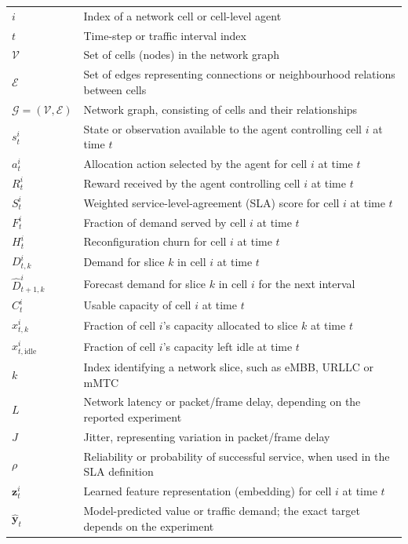 \begin{longtable}{p{3.2cm} p{11cm}}
$i$ & Index of a network cell or cell-level agent \\
$t$ & Time-step or traffic interval index \\
$\mathcal{V}$ & Set of cells (nodes) in the network graph \\
$\mathcal{E}$ & Set of edges representing connections or neighbourhood relations between cells \\
$\mathcal{G}=(\mathcal{V},\mathcal{E})$ & Network graph, consisting of cells and their relationships \\
$s_t^i$ & State or observation available to the agent controlling cell $i$ at time $t$ \\
$a_t^i$ & Allocation action selected by the agent for cell $i$ at time $t$ \\
$R_t^i$ & Reward received by the agent controlling cell $i$ at time $t$ \\
$S_t^i$ & Weighted service-level-agreement (SLA) score for cell $i$ at time $t$ \\
$F_t^i$ & Fraction of demand served by cell $i$ at time $t$ \\
$H_t^i$ & Reconfiguration churn for cell $i$ at time $t$ \\
$D_{t,k}^i$ & Demand for slice $k$ in cell $i$ at time $t$ \\
$\widehat{D}_{t+1,k}^i$ & Forecast demand for slice $k$ in cell $i$ for the next interval \\
$C_t^i$ & Usable capacity of cell $i$ at time $t$ \\
$x_{t,k}^i$ & Fraction of cell $i$'s capacity allocated to slice $k$ at time $t$ \\
$x_{t,\mathrm{idle}}^i$ & Fraction of cell $i$'s capacity left idle at time $t$ \\
$k$ & Index identifying a network slice, such as eMBB, URLLC or mMTC \\
$L$ & Network latency or packet/frame delay, depending on the reported experiment \\
$J$ & Jitter, representing variation in packet/frame delay \\
$\rho$ & Reliability or probability of successful service, when used in the SLA definition \\
$\mathbf{z}_t^i$ & Learned feature representation (embedding) for cell $i$ at time $t$ \\
$\widehat{\mathbf{y}}_t$ & Model-predicted value or traffic demand; the exact target depends on the experiment \\
\end{longtable}

